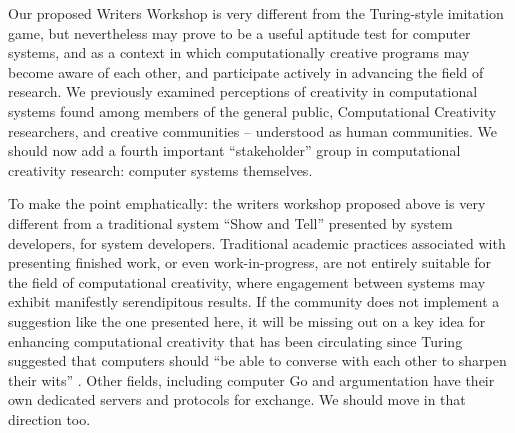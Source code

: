 
Our proposed Writers Workshop is very different from the Turing-style
imitation game, but nevertheless may prove to be a useful aptitude
test for computer systems, and as a context in which computationally
creative programs may become aware of each other, and participate
actively in advancing the field of research.  We previously examined
perceptions of creativity in computational systems found among members
of the general public, Computational Creativity researchers, and
creative communities -- understood as human communities.  We should
now add a fourth important ``stakeholder'' group in computational
creativity research: computer systems themselves.

To make the point emphatically: the writers workshop proposed above is
very different from a traditional system ``Show and Tell'' presented
by system developers, for system developers.  Traditional academic
practices associated with presenting finished work, or even
work-in-progress, are not entirely suitable for the field of
computational creativity, where engagement between systems may exhibit
manifestly serendipitous results.  If the community does not implement
a suggestion like the one presented here, it will be missing out on a
key idea for enhancing computational creativity that has been
circulating since Turing suggested that computers should ``be able to
converse with each other to sharpen their wits''
\cite{turing-intelligent}.  Other fields, including computer Go
\cite{bouzy2001computer} and argumentation \cite{yuan2008towards} have
their own dedicated servers and protocols for exchange.  We should
move in that direction too.

